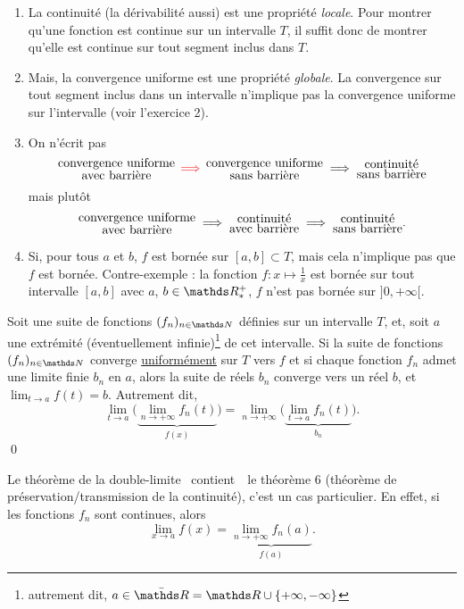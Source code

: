\begin{met}
	\begin{enumerate}
		\item La continuité (la dérivabilité aussi) est une propriété {\it locale}. Pour montrer qu'une fonction est continue sur un intervalle $T$, il suffit donc de montrer qu'elle est continue sur tout segment inclus dans $T$.
		\item Mais, la convergence uniforme est une propriété {\it globale}. La convergence sur tout segment inclus dans un intervalle n'implique pas la convergence uniforme sur l'intervalle (voir l'exercice 2).
		\item On n'écrit pas \[
				\substack{\displaystyle\text{convergence uniforme}\\\displaystyle\text{avec barrière}} \mathop{{\color{red}\implies}} \substack{\displaystyle\text{convergence uniforme}\\\displaystyle\text{sans barrière}} \implies \substack{\displaystyle\text{continuité}\\\displaystyle\text{sans barrière}}
			\] mais plutôt \[
				\substack{\displaystyle\text{convergence uniforme}\\\displaystyle\text{avec barrière}} \implies \substack{\displaystyle\text{continuité}\\\displaystyle\text{avec barrière}} \implies \substack{\displaystyle\text{continuité}\\\displaystyle\text{sans barrière}}
			.\]
		\item Si, pour tous $a$\/ et $b$, $f$\/ est bornée sur $[a,b] \subset T$, mais cela n'implique pas que $f$\/ est bornée. Contre-exemple : la fonction $f : x \mapsto \frac{1}{x}$\/ est bornée sur tout intervalle $[a,b]$\/ avec $a$, $b \in \R^+_*$,  $f$\/ n'est pas bornée sur $]0,+\infty[$.
	\end{enumerate}
\end{met}

\begin{thm}
	Soit une suite de fonctions $(f_n)_{n\in\N}$\/ définies sur un intervalle $T$, et, soit $a$\/ une extrémité (éventuellement infinie)\footnote{autrement dit, $a \in \bar\R = \R \cup \{+\infty,-\infty\}$} de cet intervalle. Si la suite de fonctions $(f_n)_{n\in\N}$\/ converge \underline{uniformément} sur $T$\/ vers $f$\/ et si chaque fonction $f_n$\/ admet une limite finie $b_n$\/ en $a$, alors la suite de réels $b_n$\/ converge vers un réel $b$, et $\lim_{t\to a} f(t) = b$. Autrement dit, \[
		\lim_{t\to a} \Big(\underbrace{\lim_{n\to +\infty} f_n(t)}_{f(x)}\Big) = \lim_{n\to +\infty} \Big(\underbrace{\lim_{t\to a} f_n(t)}_{b_n}\Big)
	.\] \qed
\end{thm}

\begin{rmkn}
	Le théorème de la double-limite \guillemotleft~contient~\guillemotright\ le théorème 6 (théorème de préservation/transmission de la continuité), c'est un cas particulier. En effet, si les fonctions $f_n$\/ sont continues, alors \[
		\lim_{x \to a}f(x) = \underbrace{\lim_{n\to +\infty} f_n(a)}_{f(a)}
	.\]
\end{rmkn}

